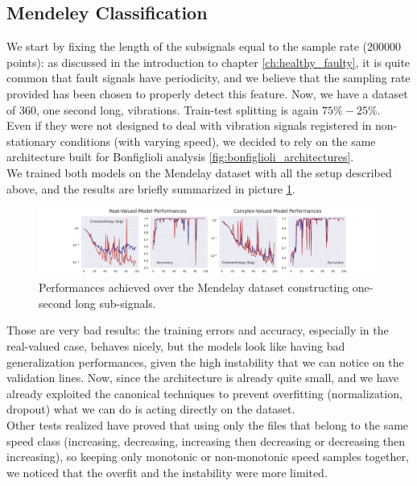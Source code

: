\documentclass[../main.tex]{subfiles}
\begin{document}
\subsection{Mendeley Classification}

We start by fixing the length of the subsignals equal to the sample rate (200000 points): as discussed in the introduction to chapter \ref{ch:healthy_faulty}, it is quite common that fault signals have periodicity, and we believe that the sampling rate provided has been chosen to properly detect this feature. Now, we have a dataset of 360, one second long, vibrations. Train-test splitting is again $75\%-25\%$.\\
Even if they were not designed to deal with vibration signals registered in non-stationary conditions (with varying speed), we decided to rely on the same architecture built for Bonfiglioli analysis \ref{fig:bonfiglioli_architectures}.\\
We trained both models on the Mendelay dataset with all the setup described above, and the results are briefly summarized in picture \ref{fig:mendeley_train_bad}.	
\begin{figure}[ht]
	\centering
	\includegraphics[width=\textwidth]{pictures/mendeley_train_bad}
	\caption{Performances achieved over the Mendelay dataset constructing one-second long sub-signals.}
	\label{fig:mendeley_train_bad}
\end{figure}
Those are very bad results: the training errors and accuracy, especially in the real-valued case, behaves nicely, but the models look like having bad generalization performances, given the high instability that we can notice on the validation lines. Now, since the architecture is already quite small, and we have already exploited the canonical techniques to prevent overfitting (normalization, dropout) what we can do is acting directly on the dataset.\\
Other tests realized have proved that using only the files that belong to the same speed class (increasing, decreasing, increasing then decreasing or decreasing then increasing), so keeping only monotonic or non-monotonic speed samples together, we noticed that the overfit and the instability were more limited.\\
\end{document}
